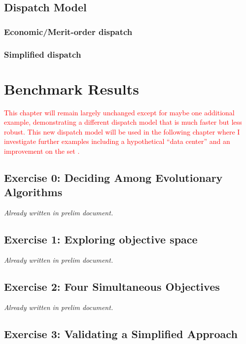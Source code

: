 \section{Dispatch Model}

\subsection{Economic/Merit-order dispatch}

\subsection{Simplified dispatch}


\chapter{Benchmark Results}
\label{chapter:benchmark-results}

\textcolor{red}{This chapter will remain largely unchanged except for maybe one
additional example, demonstrating a different dispatch model that is much faster
but less robust. This new dispatch model will be used in the following chapter
where I investigate further examples including a hypothetical ``data center''
and an improvement on the \acf{set} \cite{wigeland_nuclear_2014}.}

\section{Exercise 0: Deciding Among Evolutionary Algorithms}

\textit{Already written in prelim document.}

\section{Exercise 1: Exploring objective space}

\textit{Already written in prelim document.}

\section{Exercise 2: Four Simultaneous Objectives}

\textit{Already written in prelim document.}

\section{Exercise 3: Validating a Simplified Approach}

